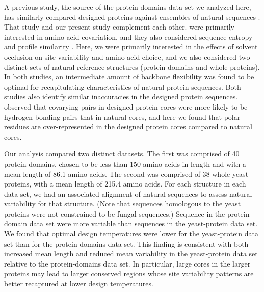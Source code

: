 \documentclass[12pt]{article}
\begin{document}
A previous study, the source of the protein-domains data set we analyzed here, has similarly compared designed proteins against ensembles of natural sequences \citep{OllikainenKortemme}. That study and our present study complement each other. \citet{OllikainenKortemme} were primarily interested in amino-acid covariation, and they also considered sequence entropy and profile similarity \citep{Yona2002}. Here, we were primarily interested in the effects of solvent occlusion on site variability and amino-acid choice, and we also considered two distinct sets of natural reference structures (protein domains and whole proteins). In both studies, an intermediate amount of backbone flexibility was found to be optimal for recapitulating characteristics of natural protein sequences.  Both studies also identify similar inaccuracies in the designed protein sequences.  \citet{OllikainenKortemme} observed that covarying pairs in designed protein cores were more likely to be hydrogen bonding pairs that in natural cores, and here we found that polar residues are over-represented in the designed protein cores compared to natural cores.

Our analysis compared two distinct datasets. The first was comprised of 40 protein domains, chosen to be less than 150 amino acids in length and with a mean length of 86.1 amino acids. The second was comprised of 38 whole yeast proteins, with a mean length of 215.4 amino acids. For each structure in each data set, we had an associated alignment of natural sequences to assess natural variability for that structure. (Note that sequences homologous to the yeast proteins were not constrained to be fungal sequences.) Sequence in the protein-domain data set were more variable than sequences in the yeast-protein data set. We found that optimal design temperatures were lower for the yeast-protein data set than for the protein-domains data set. This finding is consistent with both increased mean length and reduced mean variability in the yeast-protein data set relative to the protein-domains data set. In particular, large cores in the larger proteins may lead to larger conserved regions whose site variability patterns are better recaptured at lower design temperatures. 
\end{document}
